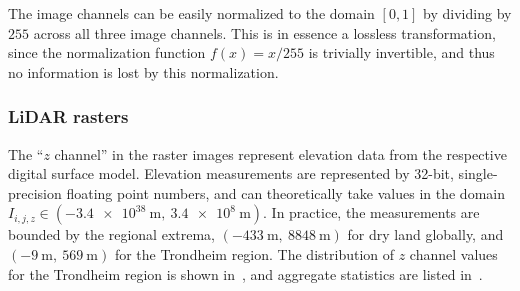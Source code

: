 The image channels can be easily normalized to the domain $[0, 1]$ by dividing by $255$ across all three image channels.
This is in essence a lossless transformation, since the normalization function $f(x) = x/255$ is trivially invertible, and thus no information is lost by this normalization.

\subsubsection*{LiDAR rasters}

The \enquote{$z$ channel} in the raster images represent elevation data from the respective digital surface model.
Elevation measurements are represented by 32-bit, single-precision floating point numbers, and can theoretically take values in the domain $I_{i,j,z} \in (\SI{-3.4e38}{\meter},~\SI{3.4e8}{\meter})$.
In practice, the measurements are bounded by the regional extrema, $(\SI{-433}{\meter},~\SI{8848}{\meter})$ for dry land globally, and $(\SI{-9}{\meter},~\SI{569}{\meter})$ for the Trondheim region.
The distribution of $z$ channel values for the Trondheim region is shown in~, and aggregate statistics are listed in~.

\begin{figure}[htb]
  \begin{floatrow}
  \end{floatrow}
\end{figure}

